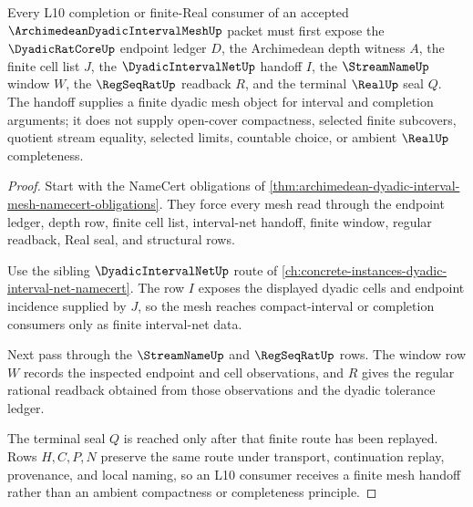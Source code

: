 \begin{theorem}
\label{thm:archimedean-dyadic-interval-mesh-l10-handoff}
Every L10 completion or finite-Real consumer of an accepted $\ArchimedeanDyadicIntervalMeshUp$ packet must first expose the $\DyadicRatCoreUp$ endpoint ledger $D$, the Archimedean depth witness $A$, the finite cell list $J$, the $\DyadicIntervalNetUp$ handoff $I$, the $\StreamNameUp$ window $W$, the $\RegSeqRatUp$ readback $R$, and the terminal $\RealUp$ seal $Q$. The handoff supplies a finite dyadic mesh object for interval and completion arguments; it does not supply open-cover compactness, selected finite subcovers, quotient stream equality, selected limits, countable choice, or ambient $\RealUp$ completeness.
\end{theorem}
\begin{proof}
Start with the NameCert obligations of \autoref{thm:archimedean-dyadic-interval-mesh-namecert-obligations}. They force every mesh read through the endpoint ledger, depth row, finite cell list, interval-net handoff, finite window, regular readback, Real seal, and structural rows.

Use the sibling $\DyadicIntervalNetUp$ route of \autoref{ch:concrete-instances-dyadic-interval-net-namecert}. The row $I$ exposes the displayed dyadic cells and endpoint incidence supplied by $J$, so the mesh reaches compact-interval or completion consumers only as finite interval-net data.

Next pass through the $\StreamNameUp$ and $\RegSeqRatUp$ rows. The window row $W$ records the inspected endpoint and cell observations, and $R$ gives the regular rational readback obtained from those observations and the dyadic tolerance ledger.

The terminal seal $Q$ is reached only after that finite route has been replayed. Rows $H,C,P,N$ preserve the same route under transport, continuation replay, provenance, and local naming, so an L10 consumer receives a finite mesh handoff rather than an ambient compactness or completeness principle.
\end{proof}


